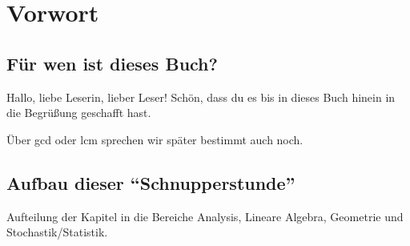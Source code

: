 \documentclass[11pt,reqno, a4paper]{book}
\theoremstyle{mystyle}
\theoremstyle{definition}
\numberwithin{equation}{chapter}
\begin{document}


\tableofcontents

\chapter{Vorwort}

\section{Für wen ist dieses Buch?}
Hallo, liebe Leserin, lieber Leser! Schön, dass du es bis in dieses Buch hinein in die Begrüßung geschafft hast. 

Über \acrshort{gcd} oder \acrlong{lcm} sprechen wir später bestimmt auch noch. 

\section{Aufbau dieser "`Schnupperstunde"'}
Aufteilung der Kapitel in die Bereiche Analysis, Lineare Algebra, Geometrie und Stochastik/Statistik. 
\end{document}
